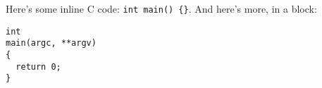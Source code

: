\documentclass{article}
\def\cverb{\verb}
\begin{document}
Here's some inline C code: \cverb|int main() {}|. And here's more, in a block:

\begin{verbatim}
int
main(argc, **argv)
{
  return 0;
}
\end{verbatim}
\end{document}
